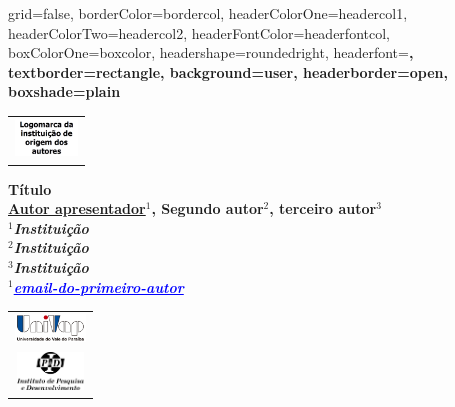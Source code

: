 \documentclass[a0paper,portrait]{baposter}
\begin{document}
\begin{poster}{
grid=false,
borderColor=bordercol, %
headerColorOne=headercol1, %
headerColorTwo=headercol2, %
headerFontColor=headerfontcol, %
boxColorOne=boxcolor, %
headershape=roundedright, %
headerfont=\Large\sf\bf, %
textborder=rectangle,
background=user,
headerborder=open, %
boxshade=plain
}
{\begin{tabular}{c} \includegraphics[height=1cm]{logomarca.png}\\
\end{tabular}
}  
%
%
{\bf  \LARGE {Título} \\ %
\vspace{0.2cm} 
\footnotesize \underline{Autor apresentador}$^1$, Segundo autor$^2$, terceiro autor$^3$ \\  %
\footnotesize $^1$\it {Instituição}\\ $^2$\it{Instituição} \\ $^3$\it{Instituição}\\ %
\footnotesize $^1$\it{\textcolor{blue}{\underline{email-do-primeiro-autor}}}}

{\begin{tabular}{c} \includegraphics[height=0.75cm]{UNIVAP-SF.png}\\
\includegraphics[height=1cm]{ipd2-sf.png}
\end{tabular}
}  

\end{poster}
\end{document}
